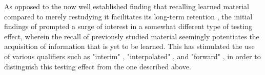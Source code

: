 \documentclass[../main.tex]{subfiles}
\begin{document}
As opposed to the now well established finding that recalling learned material compared to merely restudying it facilitates its long-term retention \citep{roedigeriiiPowerTestingMemory2006, roedigeriiiTestEnhancedLearningTaking2006, rowlandEffectTestingRestudy2014, adesopeRethinkingUseTests2017}, the initial findings of \cite{szpunarTestingStudyInsulates2008} prompted a surge of interest in a somewhat different type of testing effect, wherein the recall of previously studied material seemingly potentiates the acquisition of information that is yet to be learned. This has stimulated the use of various qualifiers such as "interim" \cite{wissmanInterimTestEffect2011}, "interpolated" \cite{szpunarInterpolatedMemoryTests2013}, and "forward" \cite{pastotterRetrievalPracticeEnhances2014,yangEnhancingLearningRetrieval2018}, in order to distinguish this testing effect from the one described above. 

{
    \biblio
}
\end{document}
